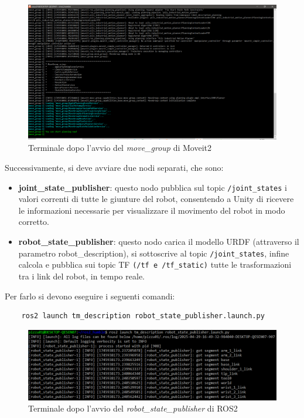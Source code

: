 \documentclass[11pt]{report}
\begin{document}
\begin{figure} [H]
    \centering
    \includegraphics[width=1\textwidth]{images/move_group.PNG}
    \caption{Terminale dopo l'avvio del \textit{move\_group} di Moveit2}
    \label{fig:move_group}
\end{figure}

Successivamente, si deve avviare due nodi separati, che sono:
\begin{itemize}
    \item \textbf{joint\_state\_publisher}: questo nodo pubblica sul topic \texttt{/joint\_states} i valori correnti di tutte le giunture del robot, consentendo a Unity di ricevere le informazioni necessarie per visualizzare il movimento del robot in modo corretto.
    \item \textbf{robot\_state\_publisher}: questo nodo carica il modello URDF (attraverso il parametro robot\_description), si sottoscrive al topic \texttt{/joint\_states}, infine calcola e pubblica sui topic TF \texttt{(/tf e /tf\_static)} tutte le trasformazioni tra i link del robot, in tempo reale.
\end{itemize}

Per farlo si devono eseguire i seguenti comandi:

\begin{verbatim}
    ros2 launch tm_description robot_state_publisher.launch.py
\end{verbatim}

\begin{figure} [H]
    \centering
    \includegraphics[width=1\textwidth]{images/terminale_2.PNG}
    \caption{Terminale dopo l'avvio del \textit{robot\_state\_publisher} di ROS2}
    \label{fig:terminale_2}
\end{figure}
\end{document}
